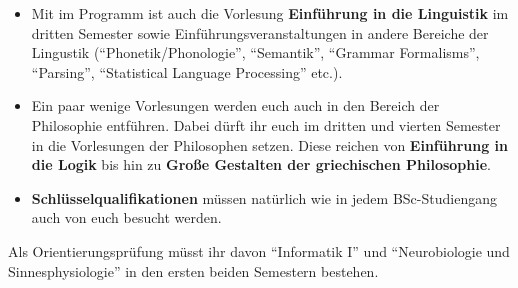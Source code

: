 \begin{itemize}
\item Mit im Programm ist auch die Vorlesung \textbf{Einführung in die 
Linguistik} im dritten Semester sowie Einf\"uhrungsveranstaltungen in andere 
Bereiche der Lingustik ("`Phonetik/Phonologie"', "`Semantik"', "`Grammar 
Formalisms"', "`Parsing"', "`Statistical Language Processing"' etc.).

\item Ein paar wenige Vorlesungen werden euch auch in den Bereich der 
Philosophie entführen. Dabei dürft ihr euch im dritten und vierten Semester in 
die Vorlesungen der Philosophen setzen. Diese reichen von  \textbf{Einführung 
in die Logik} bis hin zu \textbf{Große Gestalten der griechischen Philosophie}.

\item \textbf{Schlüsselqualifikationen} müssen natürlich wie in jedem 
BSc-Studiengang auch von euch besucht werden.

\end{itemize}

Als Orientierungsprüfung müsst ihr davon "`Informatik I"' und "`Neurobiologie 
und Sinnesphysiologie"' in den ersten beiden Semestern bestehen.

